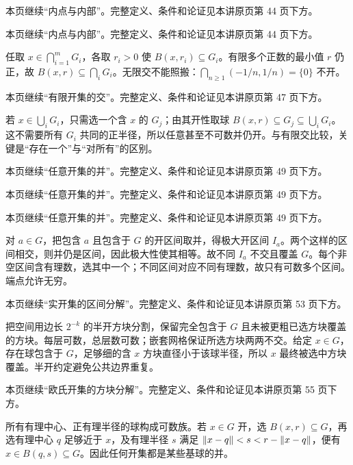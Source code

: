 本页继续“内点与内部”。完整定义、条件和论证见本讲原页第 44 页下方。

本页继续“内点与内部”。完整定义、条件和论证见本讲原页第 44 页下方。

任取 $x\in\bigcap_{i=1}^mG_i$，各取 $r_i>0$ 使 $B(x,r_i)\subseteq G_i$。有限多个正数的最小值 $r$ 仍正，故 $B(x,r)\subseteq\bigcap_iG_i$。无限交不能照搬：$\bigcap_{n\ge1}(-1/n,1/n)=\{0\}$ 不开。

本页继续“有限开集的交”。完整定义、条件和论证见本讲原页第 47 页下方。

若 $x\in\bigcup_iG_i$，只需选一个含 $x$ 的 $G_j$；由其开性取球 $B(x,r)\subseteq G_j\subseteq\bigcup_iG_i$。这不需要所有 $G_i$ 共同的正半径，所以任意甚至不可数并仍开。与有限交比较，关键是“存在一个”与“对所有”的区别。

本页继续“任意开集的并”。完整定义、条件和论证见本讲原页第 49 页下方。

本页继续“任意开集的并”。完整定义、条件和论证见本讲原页第 49 页下方。

本页继续“任意开集的并”。完整定义、条件和论证见本讲原页第 49 页下方。

对 $a\in G$，把包含 $a$ 且包含于 $G$ 的开区间取并，得极大开区间 $I_a$。两个这样的区间相交，则并仍是区间，因此极大性使其相等。故不同 $I_a$ 不交且覆盖 $G$。每个非空区间含有理数，选其中一个；不同区间对应不同有理数，故只有可数多个区间。端点允许无穷。

本页继续“实开集的区间分解”。完整定义、条件和论证见本讲原页第 53 页下方。

把空间用边长 $2^{-k}$ 的半开方块分割，保留完全包含于 $G$ 且未被更粗已选方块覆盖的方块。每层可数，总层数可数；嵌套网格保证所选方块两两不交。给定 $x\in G$，存在球包含于 $G$，足够细的含 $x$ 方块直径小于该球半径，所以 $x$ 最终被选中方块覆盖。半开约定避免公共边界重复。

本页继续“欧氏开集的方块分解”。完整定义、条件和论证见本讲原页第 55 页下方。

所有有理中心、正有理半径的球构成可数族。若 $x\in G$ 开，选 $B(x,r)\subseteq G$，再选有理中心 $q$ 足够近于 $x$，及有理半径 $s$ 满足 $\left\lVert x-q\right\rVert<s<r-\left\lVert x-q\right\rVert$，便有 $x\in B(q,s)\subseteq G$。因此任何开集都是某些基球的并。

